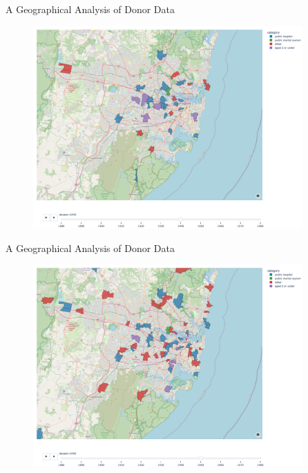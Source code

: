 \documentclass[]{beamer}
\begin{document}
\begin{frame}{A Geographical Analysis of Donor Data}
	\begin{figure}
		\includegraphics[width=0.92\textwidth]{img/choropleth_time/choropleth-7.png}
	\end{figure}
\end{frame}


\begin{frame}{A Geographical Analysis of Donor Data}
	\begin{figure}
		\includegraphics[width=0.92\textwidth]{img/choropleth_time/choropleth-8.png}
	\end{figure}
\end{frame}
\end{document}
